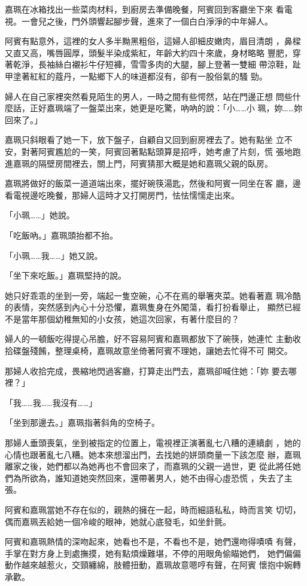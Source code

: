 嘉珮在冰箱找出一些菜肉材料，到廚房去準備晚餐，阿賓回到客廳坐下來
看電視。一會兒之後，門外頭響起腳步聲，進來了一個白白淨淨的中年婦人。

阿賓有點意外，這裡的女人多半黝黑粗俗，這婦人卻細皮嫩肉，眉目清朗
，鼻樑又直又高，嘴唇圓厚，頭髮半染成紫紅，年齡大約四十來歲，身材略略
豐肥，穿著乾淨，長袖絲白襯衫牛仔短褲，雪雪多肉的大腿，腳上登著一雙細
帶涼鞋，趾甲塗著紅紅的蔻丹，一點鄉下人的味道都沒有，卻有一股俗氣的騷
勁。

婦人在自己家裡突然看見陌生的男人，一時之間有些愕然，站在門邊正想
問些什麼話，正好嘉珮端了一盤菜出來，她更是吃驚，吶吶的說：「小……小
珮，妳……妳回來了。」

嘉珮只斜眼看了她一下，放下盤子，自顧自又回到廚房裡去了。她有點坐
立不安，對著阿賓尷尬的一笑，阿賓回著點點頭算是招呼，她考慮了片刻，慌
張地跑進嘉珮的隔壁房間裡去，關上門，阿賓猜那大概是她和嘉珮父親的臥房。

嘉珮將做好的飯菜一道道端出來，擺好碗筷湯匙，然後和阿賓一同坐在客
廳，邊看電視邊吃晚餐，那婦人這時才又打開房門，怯怯懦懦走出來。

「小珮……」她說。

「吃飯吶。」嘉珮頭抬都不抬。

「小珮……我……」她又說。

「坐下來吃飯。」嘉珮堅持的說。

她只好乖乖的坐到一旁，端起一隻空碗，心不在焉的舉箸夾菜。她看著嘉
珮冷酷的表情，突然感到內心十分恐懼，嘉珮隻身在外闖蕩，看打扮看舉止，
顯然已經不是當年那個幼稚無知的小女孩，她這次回家，有著什麼目的？

婦人的一頓飯吃得提心吊膽，好不容易阿賓和嘉珮都放下了碗筷，她連忙
主動收拾碟盤殘餚，整理桌椅，嘉珮故意坐倚著阿賓不理她，讓她去忙得不可
開交。

那婦人收拾完成，畏縮地閃過客廳，打算走出門去，嘉珮卻喊住她：「妳
要去哪裡？」

「我……我……我沒有……」

「坐到那邊去。」嘉珮指著斜角的空椅子。

那婦人垂頭喪氣，坐到被指定的位置上，電視裡正演著亂七八糟的連續劇
，她的心情也跟著亂七八糟。她本來想溜出門，去找她的姘頭商量一下該怎麼
辦，嘉珮離家之後，她們都以為她再也不會回來了，而嘉珮的父親一過世，更
從此將任她們為所欲為，誰知道她突然回來，還帶著男人，她不由得心虛恐慌
，失去了主張。

阿賓和嘉珮當她不存在似的，親熱的擁在一起，時而細語私私，時而言笑
切切，偶而嘉珮丟給她一個冷峻的眼神，她就心底發毛，如坐針氈。

阿賓和嘉珮熱情的深吻起來，她看也不是，不看也不是，她們還吻得嘖嘖
有聲，手掌在對方身上到處撫摸，她有點煩燥難堪，不停的用眼角偷瞄她們，
她們偏偏動作越來越惹火，交頸纏綿，肢體扭動，嘉珮故意嗯哼有聲，在阿賓
懷抱中婉轉承歡。


